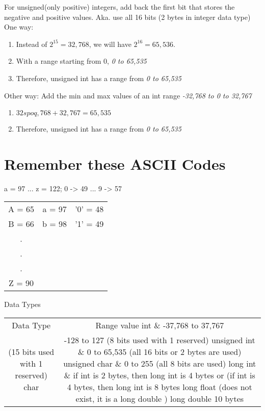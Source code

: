 \documentclass[a4paper,12pt]{book}
\begin{document}
  For unsigned(only positive) integers, add back the first bit that stores the negative and positive values. Aka. use all 16 bits (2 bytes in integer data type)
  One way:
  \begin{enumerate}
  \item Instead of $2^{15} = 32,768$, we will have $2^{16} = 65,536$.
  \item With a range starting from 0, \textit{0 to 65,535}
  \item Therefore, unsigned int has a range from \textit{0 to 65,535}
  \end{enumerate}
  Other way: Add the min and max values of an int range \textit{-32,768 to 0 to 32,767}
  \begin{enumerate}
    \item $32spo
    q ,768 + 32,767 = 65,535$
    \item Therefore, unsigned int has a range from \textit{0 to 65,535}
  \end{enumerate}

  \section{Remember these ASCII Codes}
a = 97 ... z = 122; 0 -> 49 ... 9 -> 57
  \begin{center}
    \begin{tabular}{ c c c }
    A = 65 & a = 97 & '0' = 48 \\
    B = 66 & b = 98 & '1' = 49 \\
      .                     \\  
      . \\
      .\\ 
    Z = 90
    \end{tabular}
  \end{center}


  \begin{center}
    Data Types
  \begin{tabular}{ c c }
    Data Type & Range value
    int \& -37,768 to 37,767 \\ (15 bits used with 1 reserved)
    char & -128 to 127 (8 bits used with 1 reserved)
    unsigned int \& 0 to 65,535 (all 16 bits or 2 bytes are used)
    unsigned char \& 0 to 255 (all 8 bits are used)
    long int \& if int is 2 bytes, then long int is 4 bytes or (if int is 4 bytes, then long int is 8 bytes
    long float (does not exist, it is a long double )
    long double  10 bytes
  \end{tabular}
\end{center}
\end{document}

